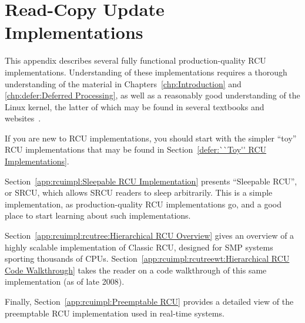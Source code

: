 
\chapter{Read-Copy Update Implementations}
\label{app:rcuimpl:Read-Copy Update Implementations}


This appendix describes several fully functional production-quality RCU
implementations.
Understanding of these implementations requires a thorough understanding
of the material in
Chapters~\ref{chp:Introduction} and
\ref{chp:defer:Deferred Processing},
as well as a reasonably good understanding of the Linux kernel,
the latter of which may be found in several textbooks and
websites~\cite{BovetCesati2005,CorbetRubiniKroahHartman,CorbetLWN,RobertLove2005}.

If you are new to RCU implementations, you should start with the
simpler ``toy'' RCU implementations that may be found in
Section~\ref{defer:``Toy'' RCU Implementations}.

Section~\ref{app:rcuimpl:Sleepable RCU Implementation} presents
``Sleepable RCU'', or SRCU, which allows SRCU readers to sleep
arbitrarily.
This is a simple implementation, as production-quality RCU implementations
go, and a good place to start learning about such implementations.

Section~\ref{app:rcuimpl:rcutree:Hierarchical RCU Overview}
gives an overview of a highly scalable implementation of Classic
RCU, designed for SMP systems sporting thousands of CPUs.
Section~\ref{app:rcuimpl:rcutreewt:Hierarchical RCU Code Walkthrough}
takes the reader on a code walkthrough of this same implementation
(as of late 2008).

Finally,
Section~\ref{app:rcuimpl:Preemptable RCU}
provides a detailed view of the preemptable RCU implementation used
in real-time systems.





